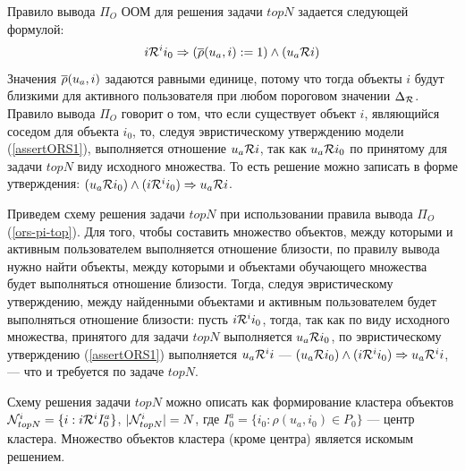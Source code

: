 Правило вывода $\Pi_O$ ООМ для решения задачи $topN$ задается следующей формулой:
\begin{equation}
	\label{ors-pi-top}
	i \mathcal{R}^i i_0 \Rightarrow (\overline{\rho}(u_a, i) := 1) \wedge (u_a \mathcal{R} i)
\end{equation}
Значения $\overline{\rho}(u_a, i)$ задаются равными единице, потому что тогда объекты $i$
будут близкими для активного пользователя при любом пороговом значении
$\Delta_{\mathcal{R}}$.
Правило вывода $\Pi_O$ говорит о том,
что если существует объект $i$, являющийся соседом для объекта $i_0$,
то, следуя эвристическому утверждению модели (\ref{assertORS1}), выполняется
отношение $u_a \mathcal{R} i$,
так как $u_a \mathcal{R} i_0$ по принятому для задачи $topN$ виду исходного множества.
То есть решение можно записать в форме утверждения: $(u_a \mathcal{R} i_0) \wedge (i \mathcal{R}^i
i_0) \Rightarrow u_a \mathcal{R} i$.

Приведем схему решения задачи $topN$ при использовании правила вывода $\Pi_O$
(\ref{ors-pi-top}). Для того, чтобы составить множество объектов, между которыми и
активным пользователем выполняется отношение близости, по правилу вывода нужно найти объекты,
между которыми и объектами обучающего множества будет выполняться отношение
близости. Тогда, следуя эвристическому утверждению, между найденными объектами
и активным пользователем будет выполняться отношение близости: пусть $i \mathcal{R}^i
i_0$, тогда, так как по виду исходного множества, принятого для задачи $topN$
выполняется $u_a \mathcal{R} i_0$, по эвристическому утверждению (\ref{assertORS1})
выполняется $u_a \mathcal{R}^i i$ ---
$(u_a \mathcal{R} i_0) \wedge
(i \mathcal{R}^i i_0) \Rightarrow u_a \mathcal{R}^i i$, --- что и требуется по задаче $topN$.

Схему решения задачи $topN$ можно описать как формирование кластера
объектов ${\mathcal{N}^i_{topN}} = \{ i : i \mathcal{R}^i I^a_0 \}$,
$|{\mathcal{N}^i_{topN}}| = N$, где
$I^a_0 = \{i_0: \rho(u_a, i_0) \in P_0\}$ --- центр кластера. Множество
объектов кластера (кроме центра) является искомым решением.

